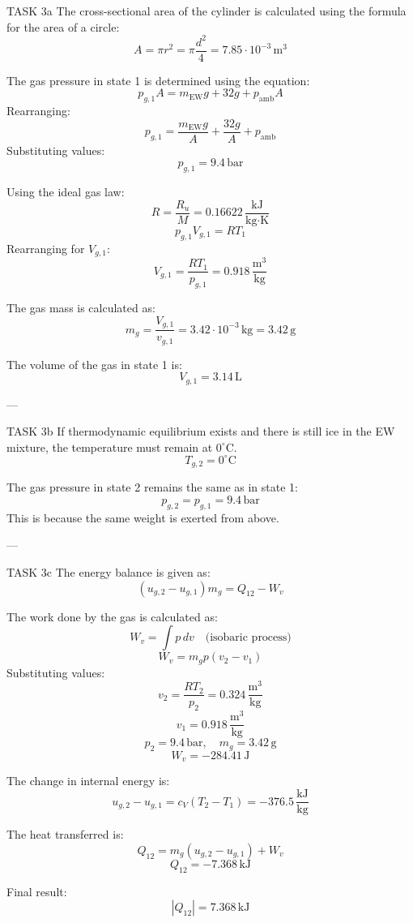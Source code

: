 TASK 3a  
The cross-sectional area of the cylinder is calculated using the formula for the area of a circle:  
\[
A = \pi r^2 = \pi \frac{d^2}{4} = 7.85 \cdot 10^{-3} \, \text{m}^3
\]  

The gas pressure in state 1 is determined using the equation:  
\[
p_{g,1} A = m_{\text{EW}} g + 32 g + p_{\text{amb}} A
\]  
Rearranging:  
\[
p_{g,1} = \frac{m_{\text{EW}} g}{A} + \frac{32 g}{A} + p_{\text{amb}}
\]  
Substituting values:  
\[
p_{g,1} = 9.4 \, \text{bar}
\]  

Using the ideal gas law:  
\[
R = \frac{R_u}{M} = 0.16622 \, \frac{\text{kJ}}{\text{kg·K}}
\]  
\[
p_{g,1} V_{g,1} = R T_1
\]  
Rearranging for \( V_{g,1} \):  
\[
V_{g,1} = \frac{R T_1}{p_{g,1}} = 0.918 \, \frac{\text{m}^3}{\text{kg}}
\]  

The gas mass is calculated as:  
\[
m_g = \frac{V_{g,1}}{v_{g,1}} = 3.42 \cdot 10^{-3} \, \text{kg} = 3.42 \, \text{g}
\]  

The volume of the gas in state 1 is:  
\[
V_{g,1} = 3.14 \, \text{L}
\]  

---

TASK 3b  
If thermodynamic equilibrium exists and there is still ice in the EW mixture, the temperature must remain at \( 0^\circ \text{C} \).  
\[
T_{g,2} = 0^\circ \text{C}
\]  

The gas pressure in state 2 remains the same as in state 1:  
\[
p_{g,2} = p_{g,1} = 9.4 \, \text{bar}
\]  
This is because the same weight is exerted from above.

---

TASK 3c  
The energy balance is given as:  
\[
(u_{g,2} - u_{g,1}) m_g = Q_{12} - W_v
\]  

The work done by the gas is calculated as:  
\[
W_v = \int p \, dv \quad \text{(isobaric process)}
\]  
\[
W_v = m_g p (v_2 - v_1)
\]  
Substituting values:  
\[
v_2 = \frac{R T_2}{p_2} = 0.324 \, \frac{\text{m}^3}{\text{kg}}
\]  
\[
v_1 = 0.918 \, \frac{\text{m}^3}{\text{kg}}
\]  
\[
p_2 = 9.4 \, \text{bar}, \quad m_g = 3.42 \, \text{g}
\]  
\[
W_v = -284.41 \, \text{J}
\]  

The change in internal energy is:  
\[
u_{g,2} - u_{g,1} = c_V (T_2 - T_1) = -376.5 \, \frac{\text{kJ}}{\text{kg}}
\]  

The heat transferred is:  
\[
Q_{12} = m_g (u_{g,2} - u_{g,1}) + W_v
\]  
\[
Q_{12} = -7.368 \, \text{kJ}
\]  

Final result:  
\[
|Q_{12}| = 7.368 \, \text{kJ}
\]  
